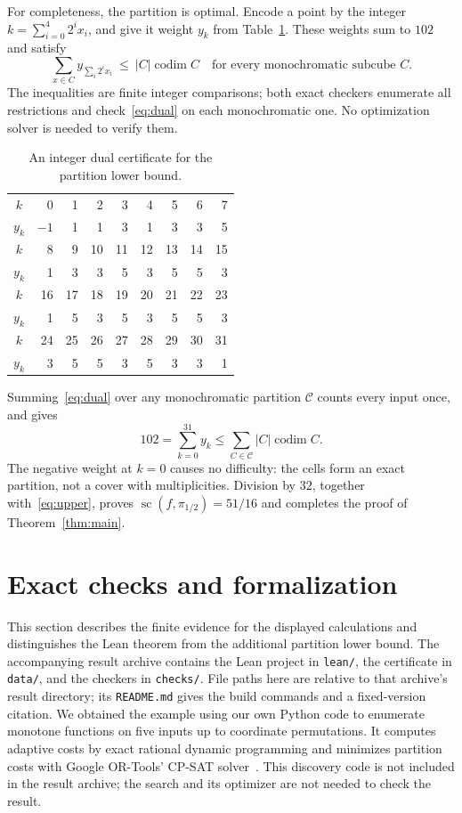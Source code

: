 \documentclass[11pt]{article}
\newcommand{\scplx}{\operatorname{sc}}
\newcommand{\codim}{\operatorname{codim}}
\begin{document}
For completeness, the partition is optimal. Encode a point by the integer
$k=\sum_{i=0}^4 2^i x_i$, and give it weight $y_k$ from
Table~\ref{tab:dual}. These weights sum to $102$ and satisfy
\begin{equation}\label{eq:dual}
 \sum_{x\in C} y_{\sum_i2^i x_i}\ \leq\ |C|\codim C
 \quad\text{for every monochromatic subcube }C.
\end{equation}
The inequalities are finite integer comparisons; both exact checkers
enumerate all restrictions and check~\eqref{eq:dual} on each monochromatic
one. No optimization solver is needed to verify them.
\begin{table}[t]
\centering
\begin{tabular}{c|rrrrrrrr}
\toprule
$k$ & 0 & 1 & 2 & 3 & 4 & 5 & 6 & 7\\
$y_k$ & $-1$ & 1 & 1 & 3 & 1 & 3 & 3 & 5\\
\midrule
$k$ & 8 & 9 & 10 & 11 & 12 & 13 & 14 & 15\\
$y_k$ & 1 & 3 & 3 & 5 & 3 & 5 & 5 & 3\\
\midrule
$k$ & 16 & 17 & 18 & 19 & 20 & 21 & 22 & 23\\
$y_k$ & 1 & 5 & 3 & 5 & 3 & 5 & 5 & 3\\
\midrule
$k$ & 24 & 25 & 26 & 27 & 28 & 29 & 30 & 31\\
$y_k$ & 3 & 5 & 5 & 3 & 5 & 3 & 3 & 1\\
\bottomrule
\end{tabular}
\caption{An integer dual certificate for the partition lower bound.}
\label{tab:dual}
\end{table}
Summing~\eqref{eq:dual} over any monochromatic partition $\mathcal C$
counts every input once, and gives
\[
 102=\sum_{k=0}^{31} y_k
 \leq\sum_{C\in\mathcal C}|C|\codim C.
\]
The negative weight at $k=0$ causes no difficulty: the cells form an exact
partition, not a cover with multiplicities. Division by $32$, together
with~\eqref{eq:upper}, proves $\scplx(f,\pi_{1/2})=51/16$ and completes
the proof of Theorem~\ref{thm:main}.

\section{Exact checks and formalization}\label{sec:checks}
This section describes the finite evidence for the displayed calculations
and distinguishes the Lean theorem from the additional partition lower
bound. The accompanying result archive contains the Lean project in
\texttt{lean/}, the certificate in \texttt{data/}, and the checkers in
\texttt{checks/}. File paths here are relative to that archive's result
directory; its \texttt{README.md} gives the build commands and a
fixed-version citation. We obtained the example using our own Python code
to enumerate monotone functions on five inputs up to coordinate
permutations. It computes adaptive costs by exact rational dynamic
programming and minimizes partition costs with Google OR-Tools' CP-SAT
solver~\cite{ORTools}. This discovery code is not included in the result
archive; the search and its optimizer are not needed to check the result.
\end{document}
